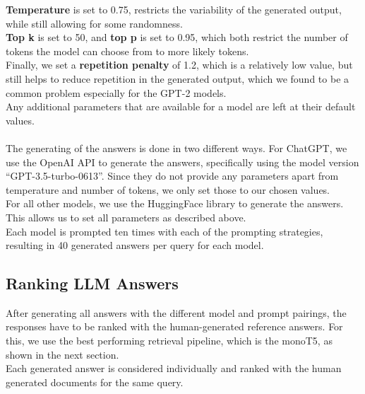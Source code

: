 \textbf{Temperature} is set to 0.75, restricts the variability of the generated output, while still allowing for some randomness.
\\
\textbf{Top k} is set to 50, and \textbf{top p} is set to 0.95, which both restrict the number of tokens the model can choose from to more likely tokens.
\\
Finally, we set a \textbf{repetition penalty} of 1.2, which is a relatively low value, but still helps to reduce repetition in the generated output, which we found to be a common problem especially for the GPT-2 models.
\\
Any additional parameters that are available for a model are left at their default values.
\\
\\
The generating of the answers is done in two different ways.
For ChatGPT, we use the OpenAI API to generate the answers, specifically using the model version ``GPT-3.5-turbo-0613''.
Since they do not provide any parameters apart from temperature and number of tokens, we only set those to our chosen values.
\\
For all other models, we use the HuggingFace library to generate the answers.
This allows us to set all parameters as described above.
\\
Each model is prompted ten times with each of the prompting strategies, resulting in 40 generated answers per query for each model.


\subsection{Ranking LLM Answers}
After generating all answers with the different model and prompt pairings, the responses have to be ranked with the human-generated reference answers.
For this, we use the best performing retrieval pipeline, which is the monoT5, as shown in the next section.
\\
Each generated answer is considered individually and ranked with the human generated documents for the same query.
\\
